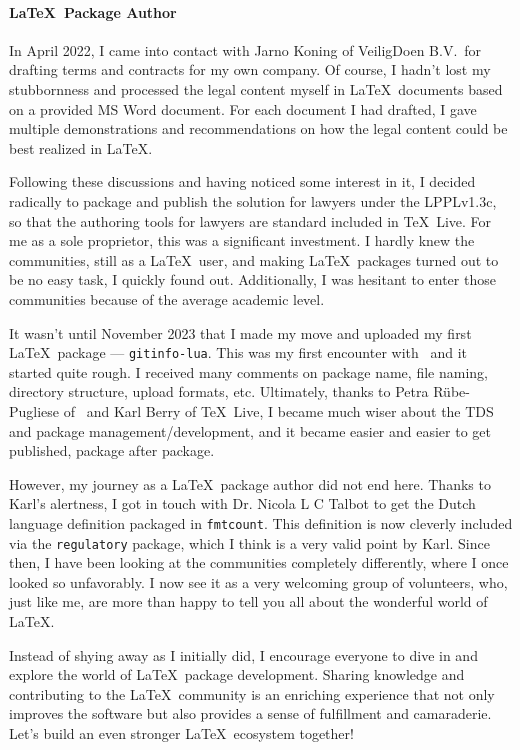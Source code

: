 \documentclass[english]{ltugboat}
\begin{document}
    \paragraph{\LaTeX\ Package Author}
    In April 2022, I came into contact with Jarno Koning of VeiligDoen B.V.\ for drafting terms and contracts for my own company.
    Of course, I hadn't lost my stubbornness and processed the legal content myself in \LaTeX\ documents based on a provided MS Word document.
    For each document I had drafted, I gave multiple demonstrations and recommendations on how the legal content could be best realized in \LaTeX.

    Following these discussions and having noticed some interest in it, I decided radically to package and publish the solution for lawyers under the LPPLv1.3c, so that the authoring tools for lawyers are standard included in \TeX\ Live.
    For me as a sole proprietor, this was a significant investment.
    I hardly knew the communities, still as a \LaTeX\ user, and making \LaTeX\ packages turned out to be no easy task, I quickly found out.
    Additionally, I was hesitant to enter those communities because of the average academic level.

    It wasn't until November 2023 that I made my move and uploaded my first \LaTeX\ package — \texttt{gitinfo-lua}.
    This was my first encounter with \CTAN\ and it started quite rough.
    I received many comments on package name, file naming, directory structure, upload formats, etc.
    Ultimately, thanks to Petra Rübe-Pugliese of \CTAN\ and Karl Berry of \TeX\ Live, I became much wiser about the TDS and package management/development, and it became easier and easier to get published, package after package.

    However, my journey as a \LaTeX\ package author did not end here.
    Thanks to Karl's alertness, I got in touch with Dr. Nicola L C Talbot to get the Dutch language definition packaged in \texttt{fmtcount}.
    This definition is now cleverly included via the \texttt{regulatory} package, which I think is a very valid point by Karl.
    Since then, I have been looking at the communities completely differently, where I once looked so unfavorably.
    I now see it as a very welcoming group of volunteers, who, just like me, are more than happy to tell you all about the wonderful world of \LaTeX.

    Instead of shying away as I initially did, I encourage everyone to dive in and explore the world of \LaTeX\ package development.
    Sharing knowledge and contributing to the \LaTeX\ community is an enriching experience that not only improves the software but also provides a sense of fulfillment and camaraderie.
    Let's build an even stronger \LaTeX\ ecosystem together!
\end{document}
